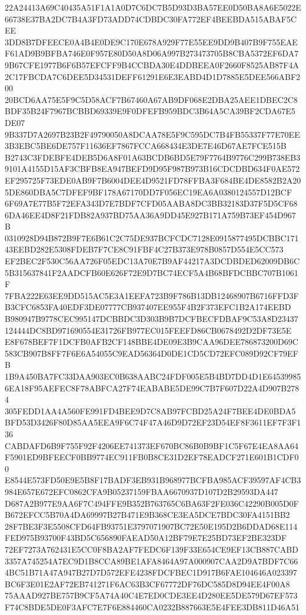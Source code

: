 \documentclass[UTF8,fontset=fandol,zihao=-4,a4paper]{ctexart}
\begin{document}
{{22A24413A69C40435A51F1A1A0D7C6DC7B5D93D3BA57EE0D50BA8A6E5022E66738E37BA2DC7B4A3FD73ADD74CDBDC30FA772EF4BEEBDA515ABAF5CEE
3DD8B7DFEECE0A4B4E0DE9C170E678A929F77E55EE9DD9B407B9F755EAEF61AD9B9BFBA746E0F957E80D50A8D06A997B273473705B8CBA5372EF6DA7
9B67CFE1977B6F6B57EFCFF9B4CCBDA30E4DDBEEA0F2660F8525AB87F4A2C17FBCDA7C6DEE5D34531DEFF61291E6E3EABD4D1D7885E5DEE566ABF200
20BCD6AA75E5F9C5D58ACF7B67460A67AB9DF068E2DBA25AEE1DBEC2C8BDF35B24F7967BCBBD69339E9F0DFEFB959BDC3B64A5CA39BF2CDA67E5DE07
9B337D7A2697B23B2F49790050A8DCAA78E5F9C595DC7B4FB55337F77E70EE3B3EBC5BE6DE757F11636EF7867FCCA668434E3DE7E46D67AE7FCE515B
B2743C3FDEBFE4DEB5D6A8F01A63BCDB6BD5E79F7764B9776C299B738EB39101A4155D15AF3CBFB8EA947BEFD9D95F987B973B16CDCDBD634F0AE572
EF295725F73EDE0AB9F7B6004DEE4D9521FD78FFBA3F684BE4DE8582B2A205DE860DBA5C7DFEF9BF178A67170DD7F056EC19EA6A0380124557D12BCF
6F69A7E77B5F72EFA343D7E7BDF7CFD05AABA8DC3BB32183D37F5D5CF686DA46EE4D8F21FDB82A937BD75AA36A9DD45E927B171A759B73EF454D967B
0310928D94B872B9F7E6B61C2C75DE937BCFCDC7128E0915877495DCBBC17143EEBD282E5308FDEB7F7CE8C91FBF4C27B373E978B0857D554E5CC573
EF2BEC2F530C56AA726F05EDC13A70E7B9AF44217A3DCDBDED62009DB6C5B315637841F2AADCFB60E626F72E9D7BC74ECF5A4B68BFDCBBC707B1061F
7FBA222E63EE9DD515AC5E3A1EEFA723B9F786B13DB12468907B6716FFD3FB3CFC6853FA40EDF3DE07777CB937407EE955F4B2F373EFC1B2A174EEBD
B980947B9778CEC995147DCBBDC3D303B9B7DCFBECFDBAF9C53A8D23437124444DC8BD971690554E31726FB977EC015FEEFD86CB0678492D2DF73E5E
E8F678BEF7F1DCFB0AFB2CF148BBE4DE09E3B9CAA96DEE786873200D69C583CB907B8FF7F6E6A54055C9EAD56364D0DE1CD5CD72EFC089D92CF79EFB
1B9A450BA7FC33DAA903EC0B638AABC24FDF005E5B4BD7DD4D1E645399856EA18F95AEFEC8F78ABFCA27F74EABABE5DE99C7B7F607D22A4D907B2784
305FEDD1AA4A560FE991FD4BEE9D7C8AB97FCBD25A24F7BEE4DE0BDA5BFD53D3426F80D85AA5EEA9F6C74F47A46D9D72EF23D54EF8F3611EF7F3F136
CABDAFD6B9F755F92F4206EE741373EF670BC86B0B9BF1C5F67E4EA8AA64F5901ED9BFEECF0BB9774EC911FB0B8CE31D2EF78EADCF271E601B1CDF00
E8544E573FD50E9E5B8F17BADF3EB931B968977BCFBA985ACF39597AF4CB3984E657E672EFC0862CFA9B05237159FBAA6670937D107D2B29593DA447
D687A2B977E9AA6F7C494FFE9B352B763765C6BA63F2FE036C42290B005D0FB672EFCC5B70A4DA69997B27B471E9B368CE3EA5DCE7BDC30FA4151BB2
28F7BE3F3E5508CFD64FB93751E3797071907BC72E50E195D2B6DDAD68E114FED975B93700F43BD5C656890FAEAD50A12BF79E7E25BD73EF2BE323DF
72EF7273A762431E5CC0F8BA2AF7FEDC6F139F33E654CE9EF13CB887CABD3357A745254A7EC9D1B8CCA89BE1AFA8464A97A000907CAA2D9A7BDF7C66
4BC51B71A47A947B27D7D572EFE4238FDCFBEC1D917B6FAE104646A023397BC6F3E01E2AF72EB741271F6AC63B3CF67772DF76DC585D8D94EE4F00A8
75AAAD927BE757B9CF5A74A40C4E7ED0CDE3EE4D280EE5DE579D67EF573F74C8BDE5DE0F3AFC7E7F6E884460CA0232B887663E5E4FEE3DB811D46A51
}}
\end{document}
